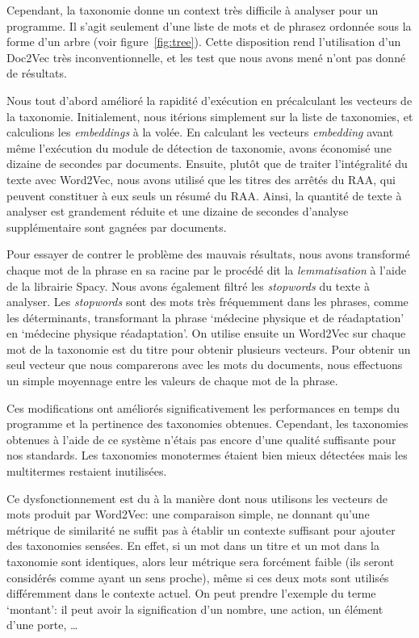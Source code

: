 Cependant, la taxonomie donne un context très difficile à analyser pour un programme.
Il s'agit seulement d'une liste de mots et de phrasez ordonnée sous la forme d'un arbre (voir figure~\ref{fig:tree}).
Cette disposition rend l'utilisation d'un Doc2Vec très inconventionnelle, et les test que nous avons mené n'ont pas donné de résultats.


Nous tout d'abord amélioré la rapidité d'exécution en précalculant les vecteurs de la taxonomie.
Initialement, nous itérions simplement sur la liste de taxonomies, et calculions les \textit{embeddings} à la volée.
En calculant les vecteurs \textit{embedding} avant même l'exécution du module de détection de taxonomie, avons économisé une dizaine de secondes par documents.
Ensuite, plutôt que de traiter l'intégralité du texte avec Word2Vec, nous avons utilisé que les titres des arrêtés du RAA, qui peuvent constituer à eux seuls un résumé du RAA\@.
Ainsi, la quantité de texte à analyser est grandement réduite et une dizaine de secondes d'analyse supplémentaire sont gagnées par documents.

Pour essayer de contrer le problème des mauvais résultats, nous avons transformé chaque mot de la phrase en sa racine par le procédé dit la \textit{lemmatisation} à l'aide de la librairie Spacy\cite{spacy}.
Nous avons également filtré les \textit{stopwords} du texte à analyser.
Les \textit{stopwords} sont des mots très fréquemment dans les phrases, comme les déterminants, transformant la phrase `médecine physique et de réadaptation' en `médecine physique réadaptation'.
On utilise ensuite un Word2Vec sur chaque mot de la taxonomie est du titre pour obtenir plusieurs vecteurs.
Pour obtenir un seul vecteur que nous comparerons avec les mots du documents, nous effectuons un simple moyennage entre les valeurs de chaque mot de la phrase.


Ces modifications ont améliorés significativement les performances en temps du programme et la pertinence des taxonomies obtenues.
Cependant, les taxonomies obtenues à l'aide de ce système n'étais pas encore d'une qualité suffisante pour nos standards.
Les taxonomies monotermes étaient bien mieux détectées mais les multitermes restaient inutilisées.


Ce dysfonctionnement est du à la manière dont nous utilisons les vecteurs de mots produit par Word2Vec: une comparaison simple, ne donnant qu'une métrique de similarité ne suffit pas à établir un contexte suffisant pour ajouter des taxonomies sensées.
En effet, si un mot dans un titre et un mot dans la taxonomie sont identiques, alors leur métrique sera forcément faible (ils seront considérés comme ayant un sens proche), même si ces deux mots sont utilisés différemment dans le contexte actuel.
On peut prendre l'exemple du terme `montant': il peut avoir la signification d'un nombre, une action, un élément d'une porte, \ldots

